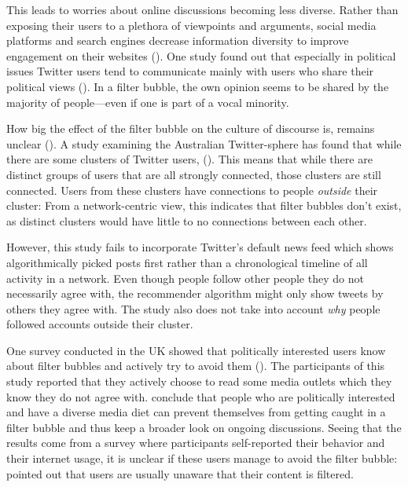 This leads to worries about online discussions becoming less diverse. Rather than exposing their users to a plethora of viewpoints and arguments, social media platforms and search engines decrease information diversity to improve engagement on their websites (\cite{bozdagBreakingFilterBubble2015}). One study found out that especially in political issues Twitter users tend to communicate mainly with users who share their political views (\cite{barberaTweetingLeftRight2015}). In a filter bubble, the own opinion seems to be shared by the majority of people---even if one is part of a vocal minority.

How big the effect of the filter bubble on the culture of discourse is, remains unclear (\cite{brunsEchoChamberWhat2017}). A study examining the Australian Twitter-sphere has found that while there are some clusters of Twitter users,  (\cite[9]{brunsEchoChamberWhat2017}). This means that while there are distinct groups of users that are all strongly connected, those clusters are still connected. Users from these clusters have connections to people \emph{outside} their cluster: From a network-centric view, this indicates that filter bubbles don't exist, as distinct clusters would have little to no connections between each other.

However, this study fails to incorporate Twitter's default news feed which shows algorithmically picked posts first rather than a chronological timeline of all activity in a network. Even though people follow other people they do not necessarily agree with, the recommender algorithm might only show tweets by others they agree with. The study also does not take into account \emph{why} people followed accounts outside their cluster. 

One survey conducted in the UK showed that politically interested users know about filter bubbles and actively try to avoid them (\cite{duboisEchoChamberOverstated2018}). The participants of this study reported that they actively choose to read some media outlets which they know they do not agree with. \citeauthor{duboisEchoChamberOverstated2018} conclude that people who are politically interested and have a diverse media diet can prevent themselves from getting caught in a filter bubble and thus keep a broader look on ongoing discussions. Seeing that the results come from a survey where participants self-reported their behavior and their internet usage, it is unclear if these users manage to avoid the filter bubble: \citeauthor{bozdagBreakingFilterBubble2015} pointed out that users are usually unaware that their content is filtered. 

